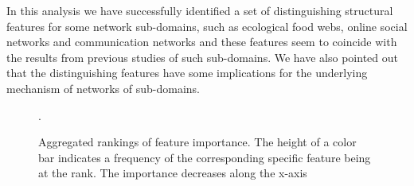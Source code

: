  In this analysis we have successfully identified a set of distinguishing structural features for some network sub-domains, such as ecological food webs, online social networks and communication networks and these features seem to coincide with the results from previous studies of such sub-domains. We have also pointed out that the distinguishing features have some implications for the underlying mechanism of networks of sub-domains.

\begin{figure}
\centering 
{}\qquad
{}
\caption{Aggregated rankings of feature importance. The height of a color bar indicates a frequency of the corresponding specific feature being at the rank. The importance decreases along the x-axis} \label{feature_importance_figures}.
\end{figure}



